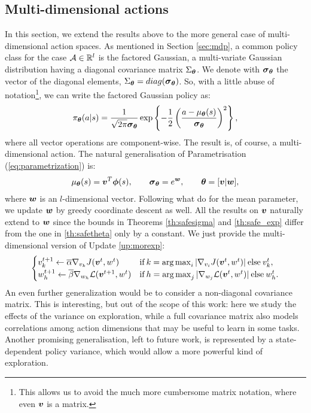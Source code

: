 \subsection{Multi-dimensional actions}\label{app:multi}
In this section, we extend the results above to the more general case of multi-dimensional action spaces.
As mentioned in Section \ref{sec:mdp}, a common policy class for the case $\Aspace\in\mathbb{R}^l$ is the factored Gaussian, \ie a multi-variate Gaussian distribution having a diagonal covariance matrix $\Sigma_{\vtheta}$. We denote with $\vsigma_{\vtheta}$ the vector of the diagonal elements, \ie $\Sigma_{\vtheta} = \mathop{diag}(\vsigma_{\vtheta})$. So, with a little abuse of notation\footnote{This allows us to avoid the much more cumbersome matrix notation, where even $\vv$ is a matrix.}, we can write the factored Gaussian policy as:
\[
\pi_{\vtheta}(a\vert s) = \frac{1}{\sqrt{2\pi}\vsigma_{\vtheta}}\exp\left\{-\frac{1}{2}\left(\frac{a - \mu_{\vtheta}(s)}{\vsigma_{\vtheta}}\right)^2\right\},
\]
where all vector operations are component-wise. The result is, of course, a multi-dimensional action. The natural generalisation of Parametrisation (\ref{eq:parametrization}) is:
\begin{align}\label{eq:parametrization_multi}
\mu_{\vtheta}(s)=\vv^T\vphi(s), \qquad \vsigma_{\vtheta}=e^{\vw}, \qquad \vtheta=[\vv\vert \vw],
\end{align}
where $\vw$ is an $l$-dimensional vector. Following what \cite{adaptive_batch} do for the mean parameter, we update $\vw$ by greedy coordinate descent as well. All the results on $\vv$ naturally extend to $\vw$ since the bounds in Theorems \ref{th:safesigma} and \ref{th:safe_exp} differ from the one in \ref{th:safetheta} only by a constant. We just provide the multi-dimensional version of Update \ref{up:morexp}:
\begin{align*}
\begin{cases}
v_{k}^{t+1} \gets \overline{\alpha}\gradJ[v_{k}]{\vv^t,w^t}
& \text{if}\:k =  \argmax_i |\gradJ[v_i]{\vv^t, w^t}| \:\text{else}\:v_{k}^t,\\
w_h^{t+1} \gets \overline{\beta}\nabla_{w_h}\mathcal{L}(\vv^{t+1}, w^t)
& \text{if}\:h =  \argmax_j |\nabla_{w_j}\mathcal{L}(\vv^t, w^t)| \:\text{else}\:w_{h}^t.
\end{cases}
\end{align*}
An even further generalization would be to consider a non-diagonal covariance matrix. This is interesting, but out of the scope of this work: here we study the effects of the variance on exploration, while a full covariance matrix also models correlations among action dimensions that may be useful to learn in some tasks.
Another promising generalisation, left to future work, is represented by a state-dependent policy variance, which would allow a more powerful kind of exploration.



